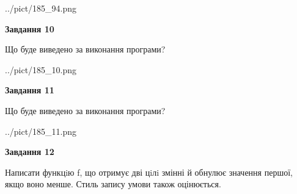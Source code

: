\documentclass[12pt, ukrainian]{article}
\begin{document}
{\begin {large}
\begin{center}
	{../pict/185_94.png}
\end{center}
\newpage

{\begin {center}\textbf{Завдання 10}\end {center}}

Що буде виведено за виконання програми?\par
\begin{center}
	{../pict/185_10.png}
\end{center}
\newpage

{\begin {center}\textbf{Завдання 11}\end {center}}

Що буде виведено за виконання програми?\par
\begin{center}
	{../pict/185_11.png}
\end{center}
\newpage

{\begin {center}\textbf{Завдання 12}\end {center}}


Написати функцiю f, що отримує дві цiлi змінні й обнулює значення першої, якщо воно менше. Стиль запису умови також оцінюється.\par
\newpage

\end {large}}
\end{document}
